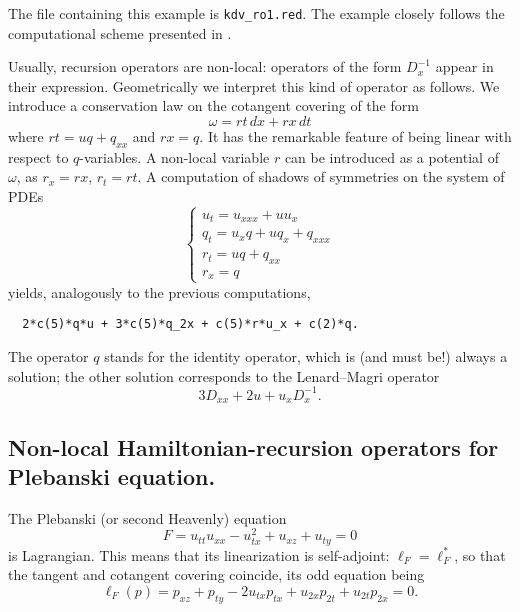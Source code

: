 The file containing this example is \texttt{kdv\_ro1.red}. The example closely
follows the computational scheme presented in \cite{KrasilshchikVerbovetskyVitolo:SPT:2012}.

Usually, recursion operators are non-local: operators of the
form $D_x^{-1}$ appear in their expression. Geometrically we interpret this
kind of operator as follows. We introduce a conservation law on the cotangent
covering of the form
\[
  \omega = rt\,dx + rx\, dt
\]
where $rt = uq+q_{xx}$ and $rx = q$. It has the remarkable feature of being
linear with respect to $q$-variables. A non-local variable $r$ can be
introduced as a potential of $\omega$, as $r_x=rx$, $r_t=rt$. A computation
of shadows of symmetries on the system of PDEs
\[
  \left\{\begin{array}{l}
    u_t=u_{xxx}+uu_x\\
    q_t=u_xq + uq_x + q_{xxx}\\
    r_t = uq+q_{xx}\\
    r_x = q
  \end{array}\right.
\]
yields, analogously to the previous computations,
\begin{verbatim}
  2*c(5)*q*u + 3*c(5)*q_2x + c(5)*r*u_x + c(2)*q.
\end{verbatim}
The operator $q$ stands for the identity operator, which is (and must be!)
always a solution; the other solution corresponds to the Lenard--Magri operator
\[
  3D_{xx} + 2u + u_xD_x^{-1}.
\]

\subsection{Non-local Hamiltonian-recursion operators for
  Plebanski equation.}
\label{cdesec:plebanski-equation}
The Plebanski (or second Heavenly) equation
\begin{equation}
  \label{eq:102}
  F=u_{tt}u_{xx}-u_{tx}^2+u_{xz}+u_{ty}=0
\end{equation}
is Lagrangian. This means that its linearization is self-adjoint:
$\ell_F=\ell^*_F$, so that the tangent and cotangent covering coincide, its odd
equation being
\begin{equation}
  \label{eq:24}
  \ell_F(p) = p_{xz} + p_{ty} - 2u_{tx}p_{tx} + u_{2x}p_{2t} + u_{2t}p_{2x} = 0.
\end{equation}

